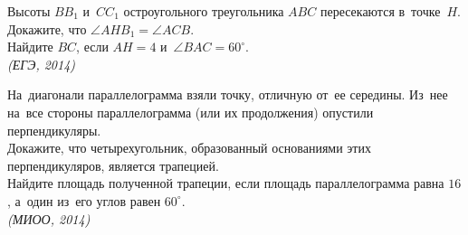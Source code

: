 \begin{problems}

\item
Высоты $B B_1$ и~$C C_1$ остроугольного треугольника $ABC$ пересекаются
в~точке~$H$.
\\
\subproblem
Докажите, что $\angle A H B_1 = \angle A C B$.
\\
\subproblem
Найдите $BC$, если $AH = 4$ и~$\angle BAC = 60^{\circ}$.
\\
\emph{(ЕГЭ, 2014)}

\item
На~диагонали параллелограмма взяли точку, отличную от~ее середины.
Из~нее на~все стороны параллелограмма (или их продолжения) опустили
перпендикуляры.
\\
\subproblem
Докажите, что четырехугольник, образованный основаниями этих перпендикуляров,
является трапецией.
\\
\subproblem
Найдите площадь полученной трапеции, если площадь параллелограмма равна $16$,
а~один из~его углов равен $60^{\circ}$.
\\
\emph{(МИОО, 2014)}

\end{problems}

